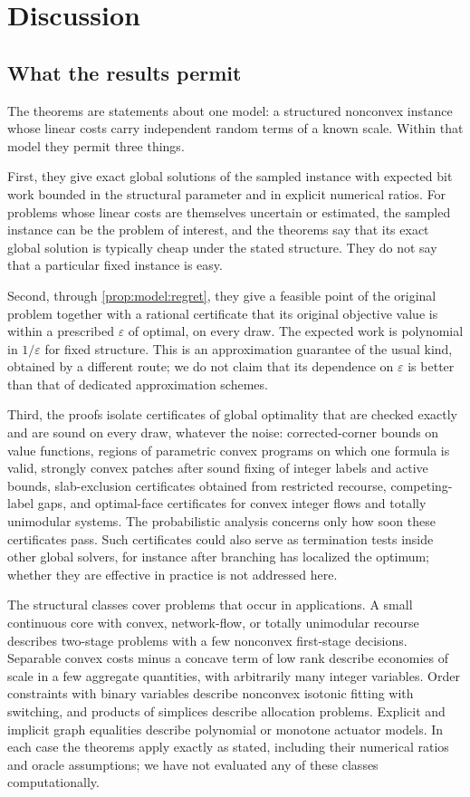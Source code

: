 \section{Discussion}\label{sec:disc}

\subsection{What the results permit}\label{sec:disc:uses}

The theorems are statements about one model: a structured nonconvex instance
whose linear costs carry independent random terms of a known scale. Within
that model they permit three things.

First, they give exact global solutions of the sampled instance with expected
bit work bounded in the structural parameter and in explicit numerical
ratios. For problems whose linear costs are themselves uncertain or
estimated, the sampled instance can be the problem of interest, and the
theorems say that its exact global solution is typically cheap under the
stated structure. They do not say that a particular fixed instance is easy.

Second, through \cref{prop:model:regret}, they give a feasible point of the
original problem together with a rational certificate that its original
objective value is within a prescribed $\varepsilon$ of optimal, on every
draw. The expected work is polynomial in $1/\varepsilon$ for fixed structure.
This is an approximation guarantee of the usual kind, obtained by a
different route; we do not claim that its dependence on $\varepsilon$ is
better than that of dedicated approximation schemes.

Third, the proofs isolate certificates of global optimality that are checked
exactly and are sound on every draw, whatever the noise: corrected-corner
bounds on value functions, regions of parametric convex programs on which one
formula is valid, strongly convex patches after sound fixing of integer
labels and active bounds, slab-exclusion certificates obtained from restricted
recourse, competing-label gaps, and optimal-face certificates for convex
integer flows and totally unimodular systems. The probabilistic analysis
concerns only how soon these certificates pass. Such certificates could also
serve as termination tests inside other global solvers, for instance after
branching has localized the optimum; whether they are effective in practice
is not addressed here.

The structural classes cover problems that occur in applications. A small
continuous core with convex, network-flow, or totally unimodular recourse
describes two-stage problems with a few nonconvex first-stage decisions.
Separable convex costs minus a concave term of low rank describe economies
of scale in a few aggregate quantities, with arbitrarily many integer
variables. Order constraints with binary variables describe nonconvex
isotonic fitting with switching, and products of simplices describe
allocation problems. Explicit and implicit graph equalities describe
polynomial or monotone actuator models. In each case the theorems apply
exactly as stated, including their numerical ratios and oracle assumptions;
we have not evaluated any of these classes computationally.

